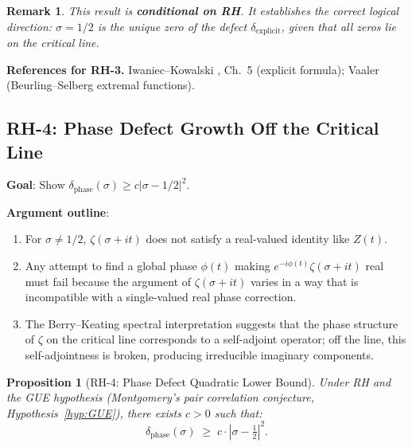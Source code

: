 \documentclass[11pt]{article}
\newtheorem{proposition}[lemma]{Proposition}
\newtheorem{remark}[lemma]{Remark}
\theoremstyle{definition}
\begin{document}
\begin{remark}
This result is \textbf{conditional on RH}.  It establishes the correct
logical direction: $\sigma = 1/2$ is the \emph{unique} zero of the
defect $\delta_{\mathrm{explicit}}$, given that all zeros lie on the
critical line.
\end{remark}

\noindent\textbf{References for RH-3.}
Iwaniec--Kowalski \cite{IK}, Ch.~5 (explicit formula);
Vaaler \cite{Vaa} (Beurling--Selberg extremal functions).

\subsection{RH-4: Phase Defect Growth Off the Critical Line}

\textbf{Goal}: Show $\delta_{\mathrm{phase}}(\sigma) \geq c |\sigma - 1/2|^2$.

\textbf{Argument outline}:
\begin{enumerate}
  \item For $\sigma \neq 1/2$, $\zeta(\sigma + it)$ does not satisfy
    a real-valued identity like $Z(t)$.
  \item Any attempt to find a global phase $\phi(t)$ making
    $e^{-i\phi(t)} \zeta(\sigma + it)$ real must fail because the
    argument of $\zeta(\sigma + it)$ varies in a way that is
    incompatible with a single-valued real phase correction.
  \item The Berry--Keating spectral interpretation suggests that the
    phase structure of $\zeta$ on the critical line corresponds to
    a self-adjoint operator; off the line, this self-adjointness
    is broken, producing irreducible imaginary components.
\end{enumerate}

\begin{proposition}[RH-4: Phase Defect Quadratic Lower Bound]
\label{prop:RH4}
Under RH and the GUE hypothesis (Montgomery's pair correlation conjecture,
Hypothesis~\ref{hyp:GUE}), there exists $c > 0$ such that:
\[
  \delta_{\mathrm{phase}}(\sigma) \;\geq\; c \cdot |\sigma - \tfrac{1}{2}|^2.
\]
\end{proposition}
\end{document}
